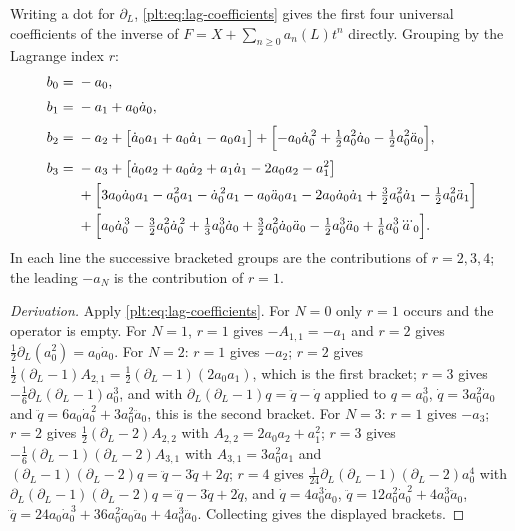 \documentclass[11pt,oneside]{article}
\theoremstyle{plain}
\theoremstyle{definition}
\theoremstyle{remark}
\begin{document}
Writing a dot for \(\partial_L\), \cref{plt:eq:lag-coefficients} gives the first
four universal coefficients of the inverse of \(F=X+\sum_{n\ge0}a_n(L)t^n\)
directly.  Grouping by the Lagrange index \(r\):
\begin{align}
  b_0={}&-a_0,\label{plt:eq:lag-b0}\\[1mm]
  b_1={}&-a_1
        +a_0\dot a_0,\label{plt:eq:lag-b1}\\[1mm]
  b_2={}&-a_2
        +\bigl[\dot a_0a_1+a_0\dot a_1-a_0a_1\bigr]
        +\Bigl[-a_0\dot a_0^{\,2}+\tfrac12a_0^2\dot a_0
               -\tfrac12a_0^2\ddot a_0\Bigr],\label{plt:eq:lag-b2}\\[1mm]
  b_3={}&-a_3
        +\bigl[\dot a_0a_2+a_0\dot a_2+a_1\dot a_1-2a_0a_2-a_1^2\bigr]
        \notag\\
       &+\Bigl[3a_0\dot a_0a_1-a_0^2a_1-\dot a_0^{\,2}a_1-a_0\ddot a_0a_1
               -2a_0\dot a_0\dot a_1+\tfrac32a_0^2\dot a_1
               -\tfrac12a_0^2\ddot a_1\Bigr]\notag\\
       &+\Bigl[a_0\dot a_0^{\,3}-\tfrac32a_0^2\dot a_0^{\,2}
               +\tfrac13a_0^3\dot a_0
               +\tfrac32a_0^2\dot a_0\ddot a_0
               -\tfrac12a_0^3\ddot a_0
               +\tfrac16a_0^3\dddot a_0\Bigr].\label{plt:eq:lag-b3}
\end{align}
In each line the successive bracketed groups are the contributions of
\(r=2,3,4\); the leading \(-a_N\) is the contribution of \(r=1\).

\begin{proof}[Derivation]
Apply \cref{plt:eq:lag-coefficients}.  For \(N=0\) only \(r=1\) occurs and the
operator is empty.  For \(N=1\), \(r=1\) gives \(-A_{1,1}=-a_1\) and \(r=2\)
gives \(\tfrac12\partial_L(a_0^2)=a_0\dot a_0\).  For \(N=2\): \(r=1\) gives
\(-a_2\); \(r=2\) gives
\(\tfrac12(\partial_L-1)A_{2,1}=\tfrac12(\partial_L-1)(2a_0a_1)\), which is the
first bracket; \(r=3\) gives
\(-\tfrac16\partial_L(\partial_L-1)a_0^3\), and with
\(\partial_L(\partial_L-1)q=\ddot q-\dot q\) applied to \(q=a_0^3\),
\(\dot q=3a_0^2\dot a_0\) and
\(\ddot q=6a_0\dot a_0^{\,2}+3a_0^2\ddot a_0\), this is the second bracket.
For \(N=3\): \(r=1\) gives \(-a_3\); \(r=2\) gives
\(\tfrac12(\partial_L-2)A_{2,2}\) with \(A_{2,2}=2a_0a_2+a_1^2\); \(r=3\) gives
\(-\tfrac16(\partial_L-1)(\partial_L-2)A_{3,1}\) with \(A_{3,1}=3a_0^2a_1\) and
\((\partial_L-1)(\partial_L-2)q=\ddot q-3\dot q+2q\); \(r=4\) gives
\(\tfrac1{24}\partial_L(\partial_L-1)(\partial_L-2)a_0^4\) with
\(\partial_L(\partial_L-1)(\partial_L-2)q=\dddot q-3\ddot q+2\dot q\), and
\(\dot q=4a_0^3\dot a_0\),
\(\ddot q=12a_0^2\dot a_0^{\,2}+4a_0^3\ddot a_0\),
\(\dddot q=24a_0\dot a_0^{\,3}+36a_0^2\dot a_0\ddot a_0+4a_0^3\dddot a_0\).
Collecting gives the displayed brackets.
\end{proof}
\end{document}
